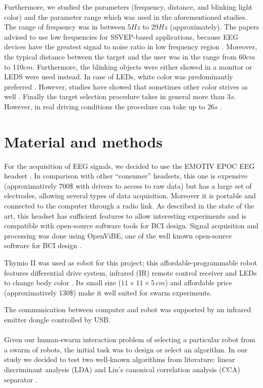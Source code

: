 \documentclass{svmult}
\begin{document}
Furthermore, we studied the parameters (frequency, distance, and blinking light color) and the parameter range which was used in the aforementioned studies. The range of frequency was in between 5$Hz$ to 29$Hz$ (approximately). The papers advised to use low frequencies for SSVEP-based applications, because EEG devices have the greatest signal to noise ratio in low frequency region \cite{paper6}. Moreover, the typical distance between the target and the user was in the range from 60$cm$ to 110$cm$. Furthermore, the blinking objects were either showed in a monitor or LEDS were used instead. In case of LEDs, white color was predominantly preferred \cite{aljshamee2014beyond, aljshamee2016discriminate}. However, studies have showed that sometimes other color strives as well \cite{SSVEPfiability}. Finally the target selection procedure takes in general more than 3$s$. However, in real driving conditions the procedure can take up to 26$s$ \cite{car}.

\section{Material and methods}
\label{sec:methods}
For the acquisition of EEG signals, we decided to use the EMOTIV EPOC EEG headset \cite{stytsenko2011evaluation}. 
In comparison with other ``consumer'' headsets, this one is expensive (approximatively 700\$ with drivers to access to raw data) but has a large set of electrodes, allowing several types of data acquisition. 
Moreover it is portable and connected to the computer through a radio link.
As described in the state of the art, this headset has sufficient features to allow interesting experiments and is compatible with open-source software tools for BCI design.
Signal acquisition and processing was done using OpenViBE, one of the well known open-source software for BCI design \cite{ov_publication}.


Thymio II was used as robot for this project; this affordable-programmable robot features differential drive system, infrared (IR) remote control receiver and LEDs to change body color \cite{Riedo-et-al-2013}. 
Its small size ($11 \times 11 \times 5\,\mathit{cm}$) and affordable price (approximatively 130\$) make it well suited for swarm experiments. 

The communication between computer and robot was supported by an infrared emitter dongle controlled by USB.
\\
\\
Given our human-swarm interaction problem of selecting a particular robot from a swarm of robots, the initial task was to design or select an algorithm. 
In our study we decided to test two well-known algorithms from literature: linear discriminant analysis (LDA) \cite{openvibeSSVEP} and Lin's canonical correlation analysis (CCA) separator \cite{Lin2014}.\\
\end{document}

